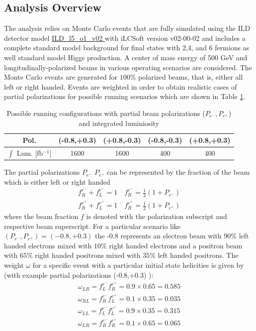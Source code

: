 \subsection{Analysis Overview}
\label{subsec:ana_overview}
The analysis relies on Monte Carlo events that are fully simulated using the ILD detector model \url{ ILD_l5_o1_v02 } with iLCSoft version v02-00-02 and includes a complete standard model background for final states with 2,4, and 6 fermions as well standard model Higgs production.  A center of mass energy of 500 GeV and longitudinally-polarized beams in various operating scenarios are considered. The Monte Carlo events are generated for $100\%$ polarized beams, that is, either all left or right handed. Events are weighted in order to obtain realistic cases of partial polarizations for possible running scenarios which are shown in Table \ref{tab:beamscenario}.

\begin{table}
\label{tab:beamscenario}
\caption{Possible running configurations with partial beam polarizations ($P_{e^-},P_{e^+}$) and integrated luminiosity \cite{ilcop} }
\begin{tabular}{|c|c|c|c|c|}
\hline 
Pol. &(-0.8,+0.3) & (+0.8,-0.3) & (-0.8,-0.3) & (+0.8,+0.3) \\ 
\hline 
$\int$ Lum. [fb$^{-1}$] & 1600 & 1600 & 400 & 400 \\ 
\hline 
\end{tabular} 

\end{table}
 The partial polarizations $P_{e^-} \, \, P_{e^+}$  can be represented by the fraction of the beam which is either left or right handed
 \begin{equation}
 \begin{split}
f_R^{e^-} + f_L^{e^-} = 1 \, \, \, \, \, \, f_R^{e^-} = \frac{1}{2}(1 + P_{e^-}) \\
f_R^{e^+} + f_L^{e^+} = 1 \, \, \, \, \, \, f_R^{e^+} = \frac{1}{2}(1 + P_{e^+})
\end{split}
 \end{equation}
where the beam fraction $f$ is denoted with the polarization subscript and respective beam superscript. For a particular scenario like $(P_{e^-}, P_{e^+}) = (-0.8, +0.3)$ the -0.8 represents an electron beam with $90\% $ left handed electrons mixed with $10\% $ right handed electrons and a positron beam with $65\%$ right handed positrons mixed with $35\%$ left handed positrons. The weight $\omega$ for a specific event with a particular initial state helicities is given by (with example partial polarizations (-0.8,+0.3) ):
 \begin{equation}
 \begin{split} 
 \omega_{LR} = f_L^{e^-}f_R^{e^+} = 0.9 \times 0.65 = 0.585 \\
 \omega_{RL} = f_R^{e^-}f_L^{e^+} = 0.1 \times 0.35 = 0.035 \\
 \omega_{LL} = f_L^{e^-}f_L^{e^+} = 0.9 \times 0.35 = 0.315 \\
 \omega_{LR} = f_R^{e^-}f_R^{e^+} = 0.1 \times 0.65 = 0.065 
 \end{split}
 \end{equation} 

